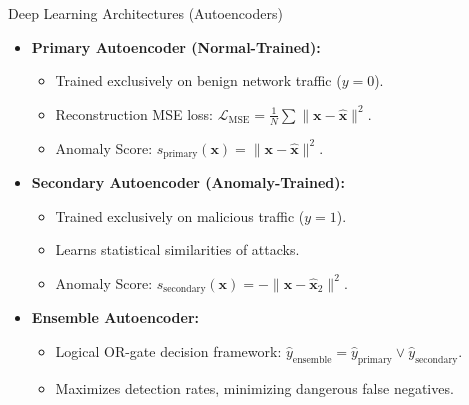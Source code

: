 \documentclass[10pt]{beamer}
\begin{document}

\begin{frame}{Deep Learning Architectures (Autoencoders)}
  \begin{itemize}
    \item \textbf{Primary Autoencoder (Normal-Trained):}
    \begin{itemize}
      \item Trained exclusively on benign network traffic ($y=0$).
      \item Reconstruction MSE loss: $\mathcal{L}_{\text{MSE}} = \frac{1}{N} \sum \|\mathbf{x} - \mathbf{\hat{x}}\|^2$.
      \item Anomaly Score: $s_{\text{primary}}(\mathbf{x}) = \|\mathbf{x} - \mathbf{\hat{x}}\|^2$.
    \end{itemize}
    \item \textbf{Secondary Autoencoder (Anomaly-Trained):}
    \begin{itemize}
      \item Trained exclusively on malicious traffic ($y=1$).
      \item Learns statistical similarities of attacks.
      \item Anomaly Score: $s_{\text{secondary}}(\mathbf{x}) = -\|\mathbf{x} - \mathbf{\hat{x}}_2\|^2$.
    \end{itemize}
    \item \textbf{Ensemble Autoencoder:}
    \begin{itemize}
      \item Logical OR-gate decision framework: $\hat{y}_{\text{ensemble}} = \hat{y}_{\text{primary}} \lor \hat{y}_{\text{secondary}}$.
      \item Maximizes detection rates, minimizing dangerous false negatives.
    \end{itemize}
  \end{itemize}
\end{frame}
\end{document}
